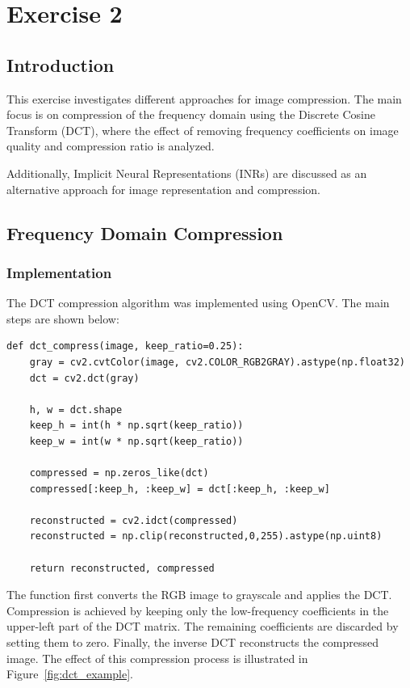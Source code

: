 \chapter{Exercise 2}

\section{Introduction}

This exercise investigates different approaches for image compression. The main focus is on compression of the frequency domain using the Discrete Cosine Transform (DCT), where the effect of removing frequency coefficients on image quality and compression ratio is analyzed.

Additionally, Implicit Neural Representations (INRs) are discussed as an alternative approach for image representation and compression.


\section{Frequency Domain Compression}

\subsection{Implementation}

The DCT compression algorithm was implemented using OpenCV. The main steps are shown below:

\begin{program}[H]
\caption{DCT image compression}
\label{prog:dct_compression}
\begin{verbatim}
def dct_compress(image, keep_ratio=0.25):
    gray = cv2.cvtColor(image, cv2.COLOR_RGB2GRAY).astype(np.float32)
    dct = cv2.dct(gray)

    h, w = dct.shape
    keep_h = int(h * np.sqrt(keep_ratio))
    keep_w = int(w * np.sqrt(keep_ratio))

    compressed = np.zeros_like(dct)
    compressed[:keep_h, :keep_w] = dct[:keep_h, :keep_w]

    reconstructed = cv2.idct(compressed)
    reconstructed = np.clip(reconstructed,0,255).astype(np.uint8)

    return reconstructed, compressed
\end{verbatim}
\end{program}

The function first converts the RGB image to grayscale and applies the DCT. Compression is achieved by keeping only the low-frequency coefficients in the upper-left part of the DCT matrix. The remaining coefficients are discarded by setting them to zero. Finally, the inverse DCT reconstructs the compressed image.
The effect of this compression process is illustrated in Figure~\ref{fig:dct_example}.


